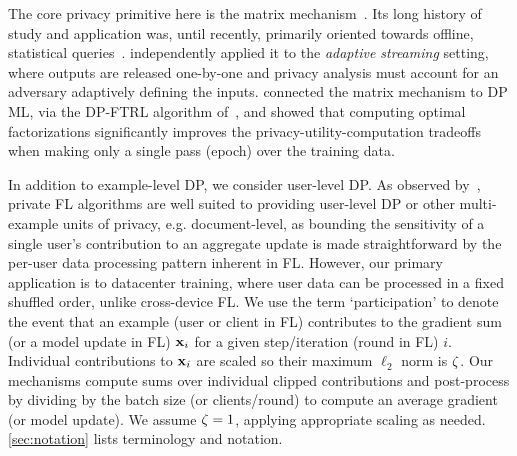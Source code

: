 \documentclass{article} %
\theoremstyle{named}
\begin{document}
    
    


The core privacy primitive here is the matrix mechanism~\citep{Li2015TheMM}. Its long history of study and application was, until recently, primarily oriented towards offline, statistical queries~\citep{hdmm,edmonds_nikolov_ullman,opt_convex_fact,HT10}.
\citet{fichtenberger_constant22,denisov22matfact} independently applied it to the \emph{adaptive streaming} setting, where outputs are released one-by-one and privacy analysis must account for an adversary adaptively defining the inputs. 
\citet{denisov22matfact} connected the matrix mechanism to DP ML, via the DP-FTRL algorithm of~\citet{kairouz2021practical}, and showed that computing optimal factorizations significantly improves the privacy-utility-computation tradeoffs when making only a single pass (epoch) over the training data.

In addition to example-level DP, we consider user-level DP. As observed by~\citet{mcmahan2017learning}, private FL algorithms are well suited to providing user-level DP or other multi-example units of privacy, e.g. document-level, as bounding the sensitivity of a single user's contribution to an aggregate update is made straightforward by the per-user data processing pattern inherent in FL. However, our primary application is to datacenter training, where user data can be processed in a fixed shuffled order, unlike cross-device FL. We use the term `participation' to denote the event that an example (user or client in FL) contributes to the gradient sum (or a model update in FL) $\mathbf{x}_i$ for a given step/iteration (round in FL) $i$. Individual contributions to $\mathbf{x}_i$ are scaled so their maximum $\ell_2$ norm is $\zeta$. Our mechanisms compute sums over individual clipped contributions and post-process by dividing by the batch size (or clients/round) to compute an average gradient (or model update).
We assume $\zeta=1$, applying appropriate scaling as needed. \cref{sec:notation} lists terminology and notation.
\end{document}
